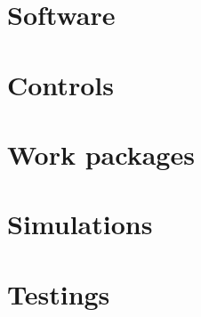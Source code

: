 \documentclass{dabcclass}
\begin{document}
\chapter{Software}
 \cleardoublepage
\chapter{Controls}
 \cleardoublepage
\chapter{Work packages}
 \cleardoublepage
\chapter{Simulations}
 \cleardoublepage
\chapter{Testings}
 \cleardoublepage

\thispagestyle{empty}
 \cleardoublepage

\end{document}
